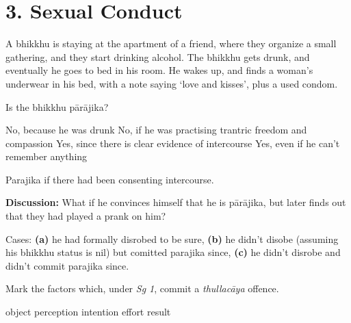 \chapter{3. Sexual Conduct}
\renewcommand*{\theChapterTitle}{3. Sexual Conduct}

\begin{exam}{\autoExamName}

\begin{problem}

  A bhikkhu is staying at the apartment of a friend, where they organize a small
  gathering, and they start drinking alcohol. The bhikkhu gets drunk, and
  eventually he goes to bed in his room. He wakes up, and finds a woman's
  underwear in his bed, with a note saying `love and kisses', plus a used
  condom.

  Is the bhikkhu pārājika? 

  \bigskip
 
  \begin{answers}{1}
    \bChoices
     No, because he was drunk\eAns
     No, if he was practising trantric freedom and compassion\eAns
     Yes, since there is clear evidence of intercourse\eAns
     Yes, even if he can't remember anything\eAns
    \eChoices
  \end{answers}

  \bigskip

  \begin{solution}
    Parajika if there had been consenting intercourse.
  \end{solution}

  \textbf{Discussion:} What if he convinces himself that he is pārājika, but
  later finds out that they had played a prank on him?

  \begin{solution}
    Cases: \textbf{(a)} he had formally disrobed to be sure, \textbf{(b)} he
    didn't disobe (assuming his bhikkhu status is nil) but comitted parajika
    since, \textbf{(c)} he didn't disrobe and didn't commit parajika since.
  \end{solution}
  
\end{problem}

\problemDivide

\begin{problem}

  Mark the factors which, under \textit{Sg 1}, commit a \textit{thullacāya} offence.

  \begin{answers}{6}
    \bChoices
     object\eAns
     perception\eAns
     intention\eAns
     effort\eAns
     result\eAns
    \eChoices
  \end{answers}


\end{problem}
\end{exam}
